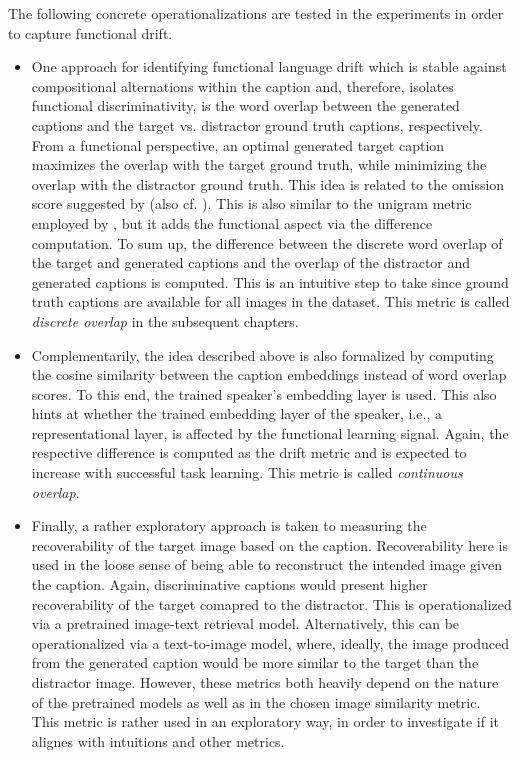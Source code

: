 The following concrete operationalizations are tested in the experiments in order to capture functional drift. \begin{itemize}
	\item One approach for identifying functional language drift which is stable against compositional alternations within the caption and, therefore, isolates functional discriminativity, is the word overlap between the generated captions and the target vs. distractor ground truth captions, respectively. From a functional perspective, an optimal generated target caption maximizes the overlap with the target ground truth, while minimizing the overlap with the distractor ground truth. This idea is related to the omission score suggested by \cite{havrylov2017emergence} (also cf. \cite{andreas2016reasoning, gunel2020supervised}). This is also similar to the unigram metric employed by \cite{lazaridou2020multi}, but it adds the functional aspect via the difference computation. To sum up, the difference between the discrete word overlap of the target and generated captions and the overlap of the distractor and generated captions is computed. This is an intuitive step to take since ground truth captions are available for all images in the dataset. This metric is called \textit{discrete overlap} in the subsequent chapters.
	\item Complementarily, the idea described above is also formalized by computing the cosine similarity between the caption embeddings instead of word overlap scores. To this end, the trained speaker's embedding layer is used. This also hints at whether the trained embedding layer of the speaker, i.e., a representational layer, is affected by the functional learning signal. Again, the respective difference is computed as the drift metric and is expected to increase with successful task learning. This metric is called \textit{continuous overlap}.
	\item {} Finally, a rather exploratory approach is taken to measuring the recoverability of the target image based on the caption. Recoverability here is used in the loose sense of being able to reconstruct the intended image given the caption. Again, discriminative captions would present higher recoverability of the target comapred to the distractor.  This is operationalized via a pretrained image-text retrieval model. Alternatively, this can be operationalized via a text-to-image model, where, ideally, the image produced from the generated caption would be more similar to the target than the distractor image. However, these metrics both heavily depend on the nature of the pretrained models as well as in the chosen image similarity metric. This metric is rather used in an exploratory way, in order to investigate if it alignes with intuitions and other metrics.
\end{itemize}
